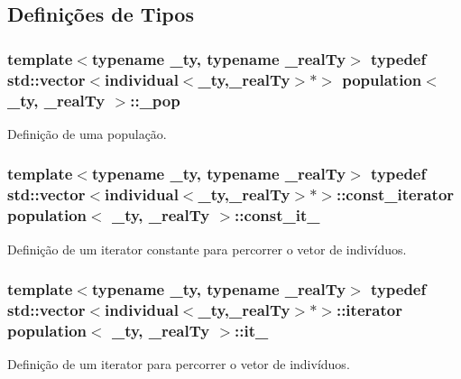 \subsection{Definições de Tipos}
\hypertarget{classpopulation_a487317a079f4b94c650983ccbd0048a5}{
\subsubsection[{\_\-pop}]{\setlength{\rightskip}{0pt plus 5cm}template$<$typename \_\-ty, typename \_\-realTy$>$ typedef std::vector$<${\bf individual}$<$\_\-ty,\_\-realTy$>$$\ast$$>$ {\bf population}$<$ \_\-ty, \_\-realTy $>$::{\bf \_\-pop}}}
\label{classpopulation_a487317a079f4b94c650983ccbd0048a5}
Definição de uma população. \hypertarget{classpopulation_afcea3753ae2b2e0211f8fdc919c51a71}{
\subsubsection[{const\_\-it\_\-}]{\setlength{\rightskip}{0pt plus 5cm}template$<$typename \_\-ty, typename \_\-realTy$>$ typedef std::vector$<${\bf individual}$<$\_\-ty,\_\-realTy$>$$\ast$$>$::const\_\-iterator {\bf population}$<$ \_\-ty, \_\-realTy $>$::{\bf const\_\-it\_\-}}}
\label{classpopulation_afcea3753ae2b2e0211f8fdc919c51a71}
Definição de um iterator constante para percorrer o vetor de indivíduos. \hypertarget{classpopulation_aa2f35e7dcc0553a7d2a96e5dca6105e0}{
\subsubsection[{it\_\-}]{\setlength{\rightskip}{0pt plus 5cm}template$<$typename \_\-ty, typename \_\-realTy$>$ typedef std::vector$<${\bf individual}$<$\_\-ty,\_\-realTy$>$$\ast$$>$::iterator {\bf population}$<$ \_\-ty, \_\-realTy $>$::{\bf it\_\-}}}
\label{classpopulation_aa2f35e7dcc0553a7d2a96e5dca6105e0}
Definição de um iterator para percorrer o vetor de indivíduos. 

